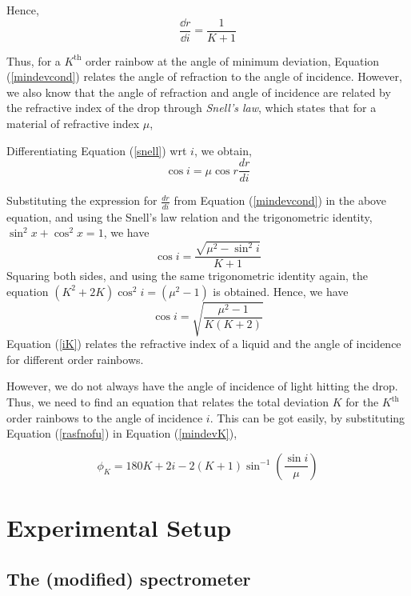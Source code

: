 Hence,         
\begin{equation}
    \frac{\dd r}{\dd i}=\frac{1}{K+1}
    \label{mindevcond}
\end{equation}

Thus, for a $K^\text{th}$ order rainbow at the angle of minimum deviation, Equation (\ref{mindevcond}) relates the angle of refraction to the angle of incidence. However, we also know that the angle of refraction and angle of incidence are related by the refractive index of the drop through \textit{Snell’s law}, which states that for a material of refractive index $\mu$, 

 
 Differentiating Equation (\ref{snell}) wrt $i$, we obtain,
 \begin{equation*}
     \cos i = \mu\cos r \frac{dr}{di}
\end{equation*}

Substituting the expression for $\frac{dr}{di}$ from Equation (\ref{mindevcond}) in the above equation, and using the Snell's law relation and the trigonometric identity, $\sin^2 x + \cos^2 x = 1$, we have
\begin{equation}
\cos i=\frac{\sqrt{\mu^{2}-\sin^{2}i}}{K+1}
\end{equation}
Squaring both sides, and using the same trigonometric identity again, the equation $(K^2 + 2K)\cos^2 i = (\mu^2 - 1)$ is obtained.
Hence, we have
\begin{equation}
    \cos i = \sqrt{\frac{\mu^2 - 1}{K(K+2)}}
    \label{iK}
\end{equation}
 Equation (\ref{iK}) relates the refractive index of a liquid and the angle of incidence for different order rainbows.
 
 However, we do not always have the angle of incidence of light hitting the drop. Thus, we need to find an equation that relates the total deviation $K$ for the $K^\text{th}$ order rainbows to the angle of incidence $i$. This can be got easily, by substituting Equation (\ref{rasfnofu}) in Equation (\ref{mindevK}),
 
 \begin{equation}
     \phi_K = 180K + 2i - 2(K+1)\sin^{-1}\left(\frac{\sin i}{\mu}\right)
 \end{equation}
 
 
\section*{Experimental Setup}

\subsection*{The (modified) spectrometer}

